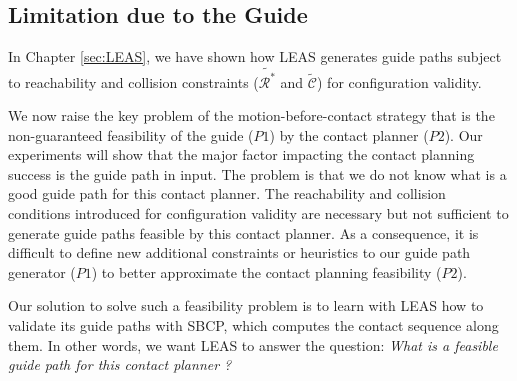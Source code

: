\subsection{Limitation due to the Guide}

In Chapter \ref{sec:LEAS}, we have shown how LEAS generates guide paths subject to reachability and collision constraints ($\tilde{\mathcal{R}^*}$ and $\tilde{\mathcal{C}}$) for configuration validity. 

We now raise the key problem of the motion-before-contact strategy that is the non-guaranteed feasibility of the guide ($P1$) by the contact planner ($P2$).
Our experiments will show that the major factor impacting the contact planning success is the guide path in input.
The problem is that we do not know what is a good guide path for this contact planner. 
The reachability and collision conditions introduced for configuration validity are necessary but not sufficient to generate guide paths feasible by this contact planner. 
As a consequence, it is difficult to define new additional constraints or heuristics to our guide path generator ($P1$) to better approximate the contact planning feasibility ($P2$).

Our solution to solve such a feasibility problem is to learn with LEAS how to validate its guide paths with SBCP, which computes the contact sequence along them. In other words, we want LEAS to answer the question: \textit{What is a feasible guide path for this contact planner ?}





